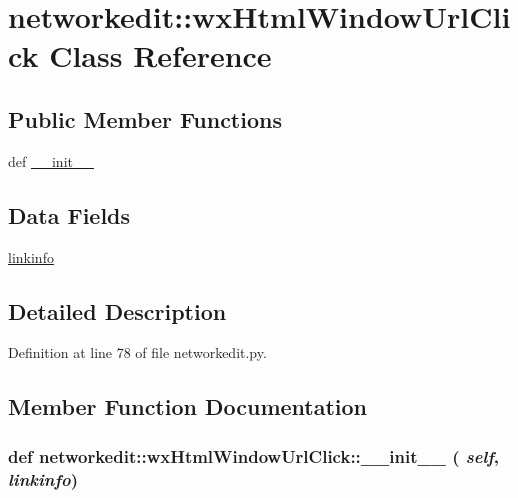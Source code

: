 \hypertarget{classnetworkedit_1_1wxHtmlWindowUrlClick}{
\section{networkedit::wx\-Html\-Window\-Url\-Click Class Reference}
\label{classnetworkedit_1_1wxHtmlWindowUrlClick}
}
\subsection*{Public Member Functions}
\begin{CompactItemize}
\item 
def \hyperlink{classnetworkedit_1_1wxHtmlWindowUrlClick_25827ced9049e3981080101f2ec13bb4}{\_\-\_\-init\_\-\_\-}
\end{CompactItemize}
\subsection*{Data Fields}
\begin{CompactItemize}
\item 
\hyperlink{classnetworkedit_1_1wxHtmlWindowUrlClick_8c1f6a4da431940a09972f01c45d015a}{linkinfo}
\end{CompactItemize}


\subsection{Detailed Description}




Definition at line 78 of file networkedit.py.

\subsection{Member Function Documentation}
\hypertarget{classnetworkedit_1_1wxHtmlWindowUrlClick_25827ced9049e3981080101f2ec13bb4}{
\subsubsection[\_\-\_\-init\_\-\_\-]{\setlength{\rightskip}{0pt plus 5cm}def networkedit::wx\-Html\-Window\-Url\-Click::\_\-\_\-init\_\-\_\- ( {\em self},  {\em linkinfo})}}
\label{classnetworkedit_1_1wxHtmlWindowUrlClick_25827ced9049e3981080101f2ec13bb4}





